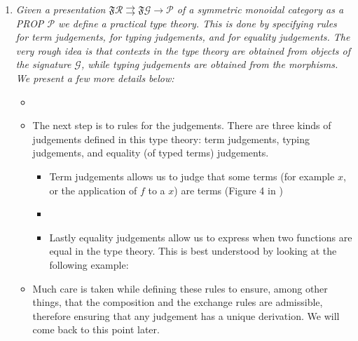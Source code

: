\documentclass[pra,floatfix,
amsmath,superscriptaddress, 12pt]{article}
\theoremstyle{definition}
\newcommand{\fF}{\mathfrak{F}}
\newcommand{\cG}{\mathcal{G}}
\newcommand{\mc}[1]{\mathcal{#1}}
\begin{document}
\begin{enumerate}
    \item \textit{Given a presentation $\mathfrak{F}\mathcal{R} \rightrightarrows\mathfrak{F}\mathcal{G}\rightarrow \mc{P}$
 of a symmetric monoidal category as a PROP $\mc{P}$ we define a practical type theory. This is done by specifying rules for term judgements, for typing judgements, and for equality judgements. The very rough idea is that contexts in the type theory are obtained from objects of the signature $\mc{G}$, while typing judgements are obtained from the morphisms. We present a few more details below:}
 \begin{itemize}
    \item %
    
    \item The next step is to rules for the judgements. There are three kinds of judgements defined in this type theory: term judgements, typing judgements, and equality (of typed terms) judgements. 
    
    \begin{itemize}
    \item Term judgements allows us to judge that some terms (for example $x$, or the application of $f$ to a $x$) are terms (Figure 4 in \cite{Shulman})
    \item    
    \item Lastly equality judgements allow us to express when two functions are equal in the type theory. This is best understood by looking at the following example: 
     \end{itemize}
	\item Much care is taken while defining these rules to ensure, among other things, that the composition and the exchange rules are admissible, therefore ensuring that any judgement has a unique derivation. We will come back to this point later. %
		\end{itemize}


\end{enumerate}
\end{document}
